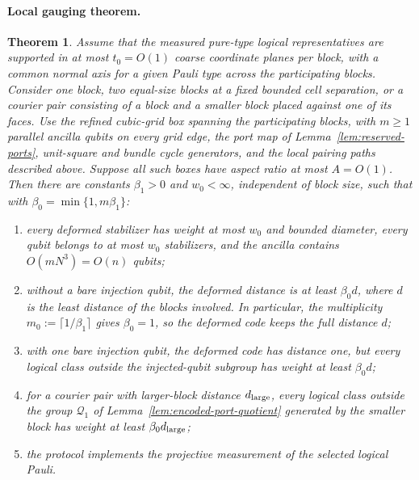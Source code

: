 \documentclass[aps,prx,reprint,superscriptaddress,nofootinbib,floatfix,longbibliography]{revtex4-2}
\newtheorem{theorem}{Theorem}[section]
\theoremstyle{definition}
\begin{document}
\paragraph{Local gauging theorem.}
\begin{theorem}
\label{thm:local-gauging}
Assume that the measured pure-type logical representatives are supported
in at most $t_0=O(1)$ coarse coordinate planes per block, with a common normal axis for a given Pauli type across the participating blocks.  Consider one
block, two equal-size blocks at a fixed bounded cell separation, or a courier
pair consisting of a block and a smaller block placed against one of its
faces.  Use the refined cubic-grid box spanning the participating blocks, with
$m\geq1$ parallel ancilla qubits on every grid edge, the port map of
Lemma~\ref{lem:reserved-ports}, unit-square and bundle cycle generators, and
the local pairing paths described above.  Suppose all such boxes have aspect
ratio at most $A=O(1)$.  Then there are constants $\beta_1>0$ and
$w_0<\infty$, independent of block size, such that with
$\beta_0=\min\{1,m\beta_1\}$:
\begin{enumerate}
 \item every deformed stabilizer has weight at most $w_0$ and bounded
 diameter, every qubit belongs to at most $w_0$ stabilizers, and the
 ancilla contains $O(mN^3)=O(n)$ qubits;
 \item without a bare injection qubit, the deformed distance is at least
 $\beta_0d$, where $d$ is the least distance of the blocks involved.  In
 particular, the multiplicity $m_0:=\lceil1/\beta_1\rceil$ gives
 $\beta_0=1$, so the deformed code keeps the full distance $d$;
 \item with one bare injection qubit, the deformed code has distance one,
 but every logical class outside the injected-qubit subgroup has weight at
 least $\beta_0d$;
 \item for a courier pair with larger-block distance $d_{\rm large}$, every
 logical class outside the group $\mathcal Q_1$ of
 Lemma~\ref{lem:encoded-port-quotient} generated by the smaller block has
 weight at least $\beta_0d_{\rm large}$;
 \item the protocol implements the projective measurement of the selected
 logical Pauli.
\end{enumerate}
\end{theorem}
\end{document}
